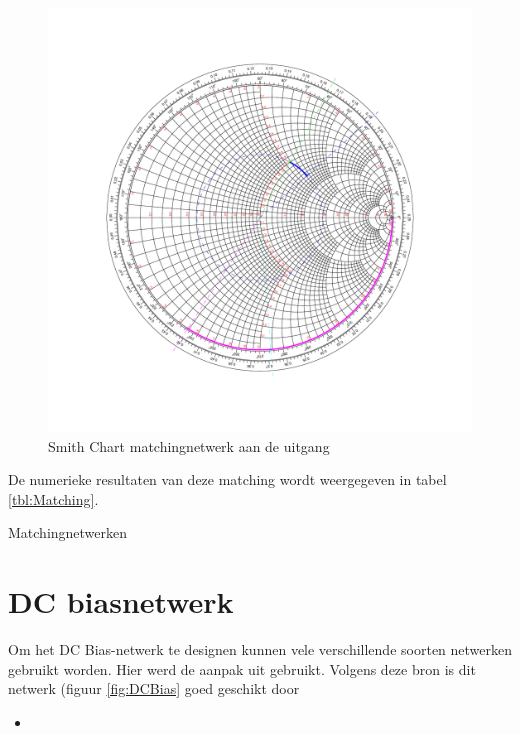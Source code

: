   \begin{figure}
    \centering
    \includegraphics[width=\textwidth,keepaspectratio=true]{fig/matchLoad.pdf}
    \caption{Smith Chart matchingnetwerk aan de uitgang}
    \label{fig:matchOut}
  \end{figure}
  
  De numerieke resultaten van deze matching wordt weergegeven in tabel \ref{tbl:Matching}.

  \begin{table}[h!]
     \begin{center}
       \caption{Matchingnetwerken}
       \label{tbl:Matching}
       
     \end{center}
  \end{table}


\section{DC biasnetwerk}
  Om het DC Bias-netwerk te designen kunnen vele verschillende soorten
  netwerken gebruikt worden. Hier werd de aanpak uit \cite{Gonzalez}
  gebruikt. Volgens deze bron is dit netwerk (figuur \ref{fig:DCBias} goed geschikt door
  \begin{itemize}
   \item 
  \end{itemize}

